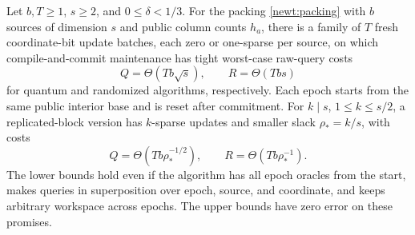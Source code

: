 \begin{theorem}
\label{newt:dynamic-scale}
Let $b,T\geq1$, $s\geq2$, and $0\leq\delta<1/3$.  For the packing
\eqref{newt:packing} with $b$ sources of dimension $s$ and public column
counts $h_a$, there is a family of $T$ fresh coordinate-bit update batches,
each zero or one-sparse per source, on which compile-and-commit maintenance
has tight worst-case raw-query costs
\begin{equation}\label{newt:dynamic-commit}
 Q=\Theta(Tb\sqrt s),\qquad R=\Theta(Tbs)
\end{equation}
for quantum and randomized algorithms, respectively.  Each epoch starts
from the same public interior base and is reset after commitment.
For $k\mid s$, $1\leq k\leq s/2$, a replicated-block version has
$k$-sparse updates and smaller slack $\rho_*=k/s$, with costs
\begin{equation}\label{newt:dynamic-margin}
 Q=\Theta(Tb\rho_*^{-1/2}),\qquad R=\Theta(Tb\rho_*^{-1}).
\end{equation}
The lower bounds hold even if the algorithm has all epoch oracles from
the start, makes queries in superposition over epoch, source, and
coordinate, and keeps arbitrary workspace across epochs.
The upper bounds have zero error on these promises.
\end{theorem}
